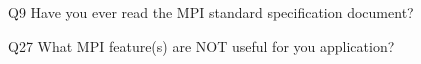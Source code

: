 \begin{description}%
\item{Q9} Have you ever read the MPI standard specification document?%
\item{Q27} What MPI feature(s) are NOT useful for you application?%
\end{description}%
